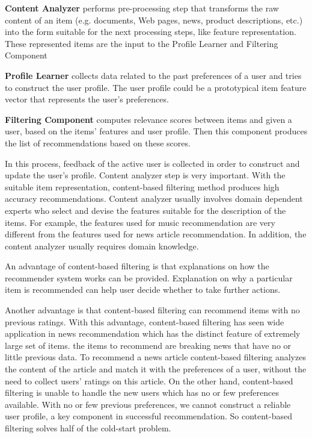 \documentclass[oneside,13pt]{extreport}
\begin{document}
\begin{description}
    \item{\textbf{Content Analyzer}} performs pre-processing step that transforms the raw content of an item (e.g. documents, Web pages, news, product descriptions, etc.) into the form suitable for the next processing steps, like feature representation. These represented items are the input to the Profile Learner and Filtering Component
    \item{\textbf{Profile Learner}} collects data related to the past preferences of a user and tries to construct the user profile. The user profile could be a prototypical item feature vector that represents the user’s preferences.
    \item{\textbf{Filtering Component}} computes relevance scores between items  and given a user, based on the items’ features and user profile. Then this component produces the list of recommendations based on these scores.
\end{description}    
    In this process, feedback of the active user is collected in order to construct and update the user's profile. Content analyzer step is very important. With the suitable item representation, content-based filtering method produces high accuracy recommendations. Content analyzer usually involves domain dependent experts who select and devise the
features suitable for the description of the items. For example, the features used for music recommendation are very different from the features used for news article recommendation. In addition, the content analyzer usually requires domain knowledge.

An advantage of content-based filtering is that explanations on how the recommender system works can be provided. Explanation on why a particular item is recommended can help user decide whether to take further actions. 

Another advantage is that content-based filtering can recommend items with no previous ratings. With this advantage, content-based filtering has seen wide application in news recommendation which has the distinct feature of extremely large set of items. the items to recommend are breaking news that have no or little previous data. To recommend a news article content-based filtering analyzes the content of the article and match it with the preferences of a user, without the need to collect users’ ratings on this article. On the other hand, content-based filtering is unable to handle the new users which has no or few preferences available. With no or few previous preferences, we cannot construct a reliable user profile, a key component in successful recommendation. So content-based filtering solves half of the cold-start problem.
\end{document}
